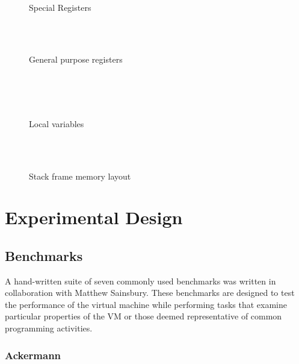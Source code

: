 \documentclass[english,a4paper]{report}
\begin{document}
\begin{figure}
	\centering
	\begin{bytefield}[bitwidth=0.3em]{64}
		 \\
		\begin{rightwordgroup}{Special Registers}
			  \\
			 \\
		\end{rightwordgroup} \\
		
		\begin{rightwordgroup}{General purpose registers}
			\\
			\\
			\\
		\end{rightwordgroup} \\
		
		\begin{rightwordgroup}{Local variables}
				\\
			 \\[1ex]
		\end{rightwordgroup} \\
	\end{bytefield}
	\caption{Stack frame memory layout}
	\label{fig:stframe}
\end{figure}


\chapter{Experimental Design}

\section{Benchmarks}

A hand-written suite of seven commonly used benchmarks was written in
collaboration with Matthew Sainsbury. These benchmarks are designed to
test the performance of the virtual machine while performing tasks
that examine particular properties of the VM or those deemed
representative of common programming activities.

\subsection{Ackermann}
\end{document}
